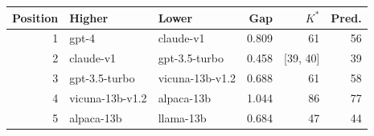 \begin{tabular}{rllrrr}
\toprule
Position & Higher & Lower & Gap & $K^*$ & Pred. \\
\midrule
1 & gpt-4 & claude-v1 & 0.809 & 61 & 56 \\
2 & claude-v1 & gpt-3.5-turbo & 0.458 & [39, 40] & 39 \\
3 & gpt-3.5-turbo & vicuna-13b-v1.2 & 0.688 & 61 & 58 \\
4 & vicuna-13b-v1.2 & alpaca-13b & 1.044 & 86 & 77 \\
5 & alpaca-13b & llama-13b & 0.684 & 47 & 44 \\
\bottomrule
\end{tabular}
